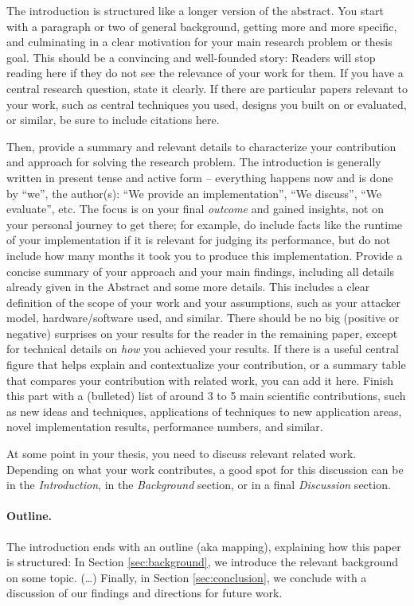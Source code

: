 \documentclass[11pt,
  titlepage=false,
  abstract=on,
]{scrreprt}
\begin{document}
The introduction is structured like a longer version of the abstract.
You start with a paragraph or two of general background, getting more and more specific, and culminating in a clear motivation for your main research problem or thesis goal.
This should be a convincing and well-founded story: Readers will stop reading here if they do not see the relevance of your work for them.
If you have a central research question, state it clearly.
If there are particular papers relevant to your work, such as central techniques you used, designs you built on or evaluated, or similar, be sure to include citations here.

Then, provide a summary and relevant details to characterize your contribution and approach for solving the research problem.
The introduction is generally written in present tense and active form -- everything happens now and is done by ``we'', the author(s):
``We provide an implementation'', ``We discuss'', ``We evaluate'', etc.
The focus is on your final \emph{outcome} and gained insights, not on your personal journey to get there; for example, do include facts like the runtime of your implementation if it is relevant for judging its performance, but do not include how many months it took you to produce this implementation.
Provide a concise summary of your approach and your main findings, including all details already given in the Abstract and some more details.
This includes a clear definition of the scope of your work and your assumptions, such as your attacker model, hardware/software used, and similar.
There should be no big (positive or negative) surprises on your results for the reader in the remaining paper, except for technical details on \emph{how} you achieved your results.
If there is a useful central figure that helps explain and contextualize your contribution, or a summary table that compares your contribution with related work, you can add it here.
Finish this part with a (bulleted) list of around 3 to 5 main scientific contributions, such as new ideas and techniques, applications of techniques to new application areas, novel implementation results, performance numbers, and similar.

At some point in your thesis, you need to discuss relevant related work.
Depending on what your work contributes, a good spot for this discussion can be in the \emph{Introduction}, in the \emph{Background} section, or in a final \emph{Discussion} section.

\paragraph{Outline.}
The introduction ends with an outline (aka mapping), explaining how this paper is structured:
In Section \ref{sec:background}, we introduce the relevant background on some topic.
(\dots)
Finally, in Section \ref{sec:conclusion}, we conclude with a discussion of our findings and directions for future work.
\end{document}
